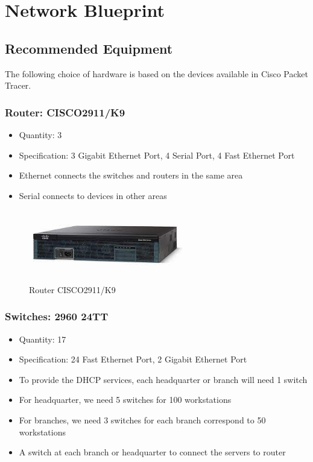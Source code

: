 \section{Network Blueprint}
\subsection{Recommended Equipment}
The following choice of hardware is based on the devices available in Cisco Packet Tracer.
\subsubsection{Router: CISCO2911/K9 }
\begin{itemize}
    \item Quantity: 3
    \item Specification: 3 Gigabit Ethernet Port, 4 Serial Port, 4 Fast Ethernet Port
    \item Ethernet connects the switches and routers in the same area
    \item Serial connects to devices in other areas
\end{itemize}
\begin{figure}[H]
    \centering
    \includegraphics[width=0.6\textwidth]{./assets/router.png}
    \caption{Router CISCO2911/K9}
\end{figure}

\subsubsection{Switches: 2960 24TT}
\begin{itemize}
    \item Quantity: 17
    \item Specification: 24 Fast Ethernet Port, 2 Gigabit Ethernet Port
    \item To provide the DHCP services, each headquarter or branch will need 1 switch
    \item For headquarter, we need 5 switches for 100 workstations
    \item For branches, we need 3 switches for each branch correspond to 50 workstations
    \item A switch at each branch or headquarter to connect the servers to router
\end{itemize}

